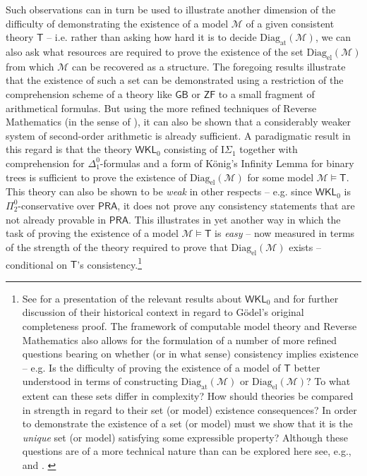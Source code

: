 \documentclass[11pt,fleqn,leqno]{article}
\begin{document}
Such observations can in turn be used to illustrate another dimension of the difficulty of demonstrating the existence of a model $\mathcal{M}$ of a given consistent theory $\mathsf{T}$ -- i.e. rather than asking  how hard it is to decide $\mathrm{Diag}_{\mathrm{at}}(\mathcal{M})$, we can also ask what resources are required to prove the existence of the set $\mathrm{Diag}_{\mathrm{el}}(\mathcal{M})$ from which  $\mathcal{M}$ can be recovered as a structure.   The foregoing results illustrate that the existence of such a set can be demonstrated using a restriction of the comprehension scheme of a theory like $\mathsf{GB}$ or $\mathsf{ZF}$ to a small fragment of arithmetical formulas.   But using the more refined techniques of Reverse Mathematics (in the sense of \citealp{Simpson2009}), it can also be shown that a considerably weaker system of second-order arithmetic is already sufficient.  A paradigmatic result in this regard is that the theory $\mathsf{WKL}_0$ consisting of $\mathrm{I}\Sigma_1$ together with comprehension for $\Delta^0_1$-formulas and a form of K\"onig's Infinity Lemma for binary trees is sufficient to prove the existence of $\mathrm{Diag}_{\mathrm{el}}(\mathcal{M})$ for some model $\mathcal{M} \models \mathsf{T}$.   This theory can also be shown to be \textsl{weak} in other respects -- e.g. since $\mathsf{WKL}_0$ is $\Pi^0_2$-conservative over $\mathsf{PRA}$, it does not prove any consistency statements that are not already provable in $\mathsf{PRA}$.  This illustrates in yet another way in which the task of proving the existence of a model $\mathcal{M} \models \mathsf{T}$ is \textsl{easy} -- now measured in terms of the strength of the theory required to prove that $\mathrm{Diag}_{\mathrm{el}}(\mathcal{M})$ exists -- conditional on $\mathsf{T}$'s consistency.\footnote{See \citep[\S II.8, \S IV.3]{Simpson2009} for a presentation of the relevant results about $\mathsf{WKL}_0$ and \citep[\S 3]{Dean2017b} for further discussion of their historical context in regard to G\"odel's original completeness proof.  The framework of computable model theory and Reverse Mathematics also allows for the formulation of a number of more refined questions bearing on whether (or in what sense) consistency implies existence -- e.g. Is the difficulty of proving the existence of a model of $\mathsf{T}$ better understood in terms of constructing $\mathrm{Diag}_{\mathrm{at}}(\mathcal{M})$ or $\mathrm{Diag}_{\mathrm{el}}(\mathcal{M})$? To what extent can these sets differ in complexity?  How should theories be compared in strength in regard to their set (or model) existence consequences?  In order to demonstrate the existence of a set (or model) must we show that it is the \textsl{unique} set (or model) satisfying some expressible property? Although these questions are of a more technical nature than can be explored here see, e.g., \citep{Ash2000} and \citep{Eastaugh2019}. \label{rmnote}}
\end{document}
